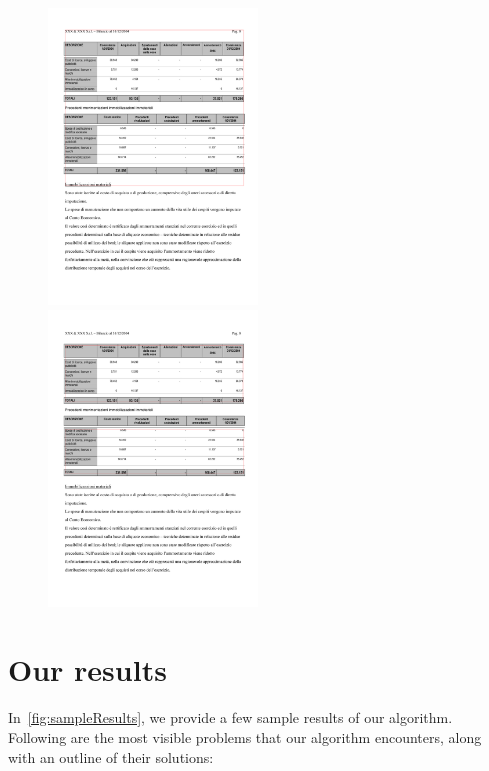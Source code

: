 \begin{figure}[t]
\centering

\includegraphics[width=15em]{img/results/tableFind2Tess.jpg}
\includegraphics[width=15em]{img/results/tableFind2Us.png}

\caption{}
\label{fig:tableFindComparison_Ours}
\end{figure}

\section{Our results}

In~\cref{fig:sampleResults}, we provide a few sample results of our algorithm. Following are the most visible problems that our algorithm encounters, along with an outline of their solutions:

